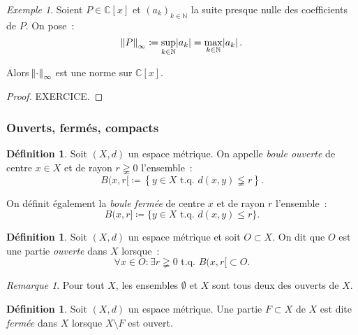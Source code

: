 \documentclass{report}
\theoremstyle{definition}
\newtheorem{déf}[thm]{Définition}
\theoremstyle{remark}
\newtheorem*{rmq}{Remarque}
\newtheorem{ex}{Exemple}[chapter]
\numberwithin{equation}{section}
\newcommand{\C}{\mathbb C}
\newcommand{\N}{\mathbb N}
\newcommand{\tq}{\text{ t.q. }}
\newcommand{\seq}[3]{\left(#1_{#2}\right)_{#2 \in #3}}
\begin{document}
				\begin{ex} Soient $P \in \C[x]$ et $\seq ak\N$ la suite presque nulle des coefficients de $P$. On pose~:
				\begin{equation}
					\norm P_\infty \coloneqq \sup_{k \in \N}\abs {a_k} = \max_{k \in \N}\abs {a_k}.
				\end{equation}

				Alors $\norm \cdot_\infty$ est une norme sur $\C[x]$.
				\end{ex}

				\begin{proof} EXERCICE.
				\end{proof}

			\subsubsection{Ouverts, fermés, compacts}
				\begin{déf} Soit $(X, d)$ un espace métrique. On appelle \textit{boule ouverte} de centre $x \in X$ et de rayon $r \gneqq 0$ l'ensemble~:
				\begin{equation}
					B(x, r[ \coloneqq \left\{y \in X \tq d(x, y) \lneqq r\right\}.
				\end{equation}

				On définit également la \textit{boule fermée} de centre $x$ et de rayon $r$ l'ensemble~:
				\begin{equation}
					B(x, r] \coloneqq \{y \in X \tq d(x, y) \leq r\}.
				\end{equation}
				\end{déf}

				\begin{déf} Soit $(X, d)$ un espace métrique et soit $O \subset X$. On dit que $O$ est une partie \textit{ouverte} dans $X$ lorsque~:
				\begin{equation}
					\forall x \in O : \exists r \gneqq 0 \tq B(x, r[  \subset O.
				\end{equation}
				\end{déf}

				\begin{rmq} Pour tout $X$, les ensembles $\emptyset$ et $X$ sont tous deux des ouverts de $X$. \end{rmq}

				\begin{déf} Soit $(X, d)$ un espace métrique. Une partie $F \subset X$  de $X$ est dite \textit{fermée} dans $X$ lorsque $X \setminus F$
				est ouvert. \end{déf}
\end{document}
